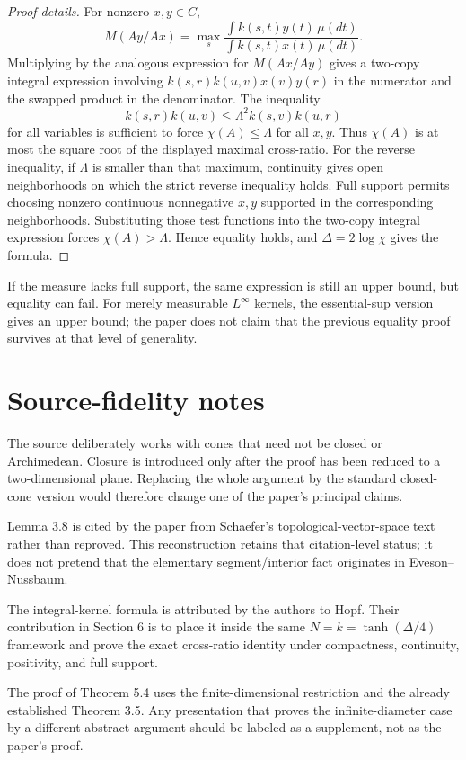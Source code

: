 \begin{proof}[Proof details]
For nonzero $x,y\in C$,
\[
  M(Ay/Ax)=\max_s
  \frac{\int k(s,t)y(t)\,\mu(dt)}{\int k(s,t)x(t)\,\mu(dt)}.
\]
Multiplying by the analogous expression for $M(Ax/Ay)$ gives a two-copy integral expression involving
$k(s,r)k(u,v)x(v)y(r)$ in the numerator and the swapped product in the denominator.
The inequality
\[
  k(s,r)k(u,v)\le \Lambda^2 k(s,v)k(u,r)
\]
for all variables is sufficient to force $\chi(A)\le\Lambda$ for all $x,y$.
Thus $\chi(A)$ is at most the square root of the displayed maximal cross-ratio.
For the reverse inequality, if $\Lambda$ is smaller than that maximum, continuity gives open neighborhoods on which the strict reverse inequality holds.
Full support permits choosing nonzero continuous nonnegative $x,y$ supported in the corresponding neighborhoods.
Substituting those test functions into the two-copy integral expression forces $\chi(A)>\Lambda$.
Hence equality holds, and $\Delta=2\log\chi$ gives the formula.
\end{proof}

\begin{remark}
If the measure lacks full support, the same expression is still an upper bound, but equality can fail.
For merely measurable $L^\infty$ kernels, the essential-sup version gives an upper bound; the paper does not claim that the previous equality proof survives at that level of generality.
\end{remark}

\section{Source-fidelity notes}
\begin{commentarynotes}
\item The source deliberately works with cones that need not be closed or
Archimedean.  Closure is introduced only after the proof has been reduced to a
two-dimensional plane.  Replacing the whole argument by the standard closed-cone
version would therefore change one of the paper's principal claims.
\item Lemma 3.8 is cited by the paper from Schaefer's topological-vector-space
text rather than reproved.  This reconstruction retains that citation-level
status; it does not pretend that the elementary segment/interior fact originates
in Eveson--Nussbaum.
\item The integral-kernel formula is attributed by the authors to Hopf.  Their
contribution in Section 6 is to place it inside the same $N=k=\tanh(\Delta/4)$
framework and prove the exact cross-ratio identity under compactness,
continuity, positivity, and full support.
\item The proof of Theorem 5.4 uses the finite-dimensional restriction and the
already established Theorem 3.5.  Any presentation that proves the
infinite-diameter case by a different abstract argument should be labeled as a
supplement, not as the paper's proof.
\end{commentarynotes}

